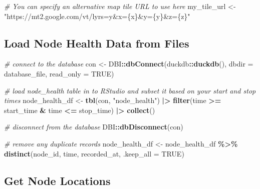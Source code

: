 \documentclass[
]{book}
\newenvironment{Shaded}{\begin{snugshade}}{\end{snugshade}}
\newcommand{\AttributeTok}[1]{\textcolor[rgb]{0.13,0.29,0.53}{#1}}
\newcommand{\CommentTok}[1]{\textcolor[rgb]{0.56,0.35,0.01}{\textit{#1}}}
\newcommand{\ConstantTok}[1]{\textcolor[rgb]{0.56,0.35,0.01}{#1}}
\newcommand{\FunctionTok}[1]{\textcolor[rgb]{0.13,0.29,0.53}{\textbf{#1}}}
\newcommand{\NormalTok}[1]{#1}
\newcommand{\OtherTok}[1]{\textcolor[rgb]{0.56,0.35,0.01}{#1}}
\newcommand{\SpecialCharTok}[1]{\textcolor[rgb]{0.81,0.36,0.00}{\textbf{#1}}}
\newcommand{\StringTok}[1]{\textcolor[rgb]{0.31,0.60,0.02}{#1}}
\begin{document}
\begin{Shaded}
\begin{Highlighting}[]
\CommentTok{\# You can specify an alternative map tile URL to use here}
\NormalTok{my\_tile\_url }\OtherTok{\textless{}{-}} \StringTok{"https://mt2.google.com/vt/lyrs=y\&x=\{x\}\&y=\{y\}\&z=\{z\}"}
\end{Highlighting}
\end{Shaded}

\subsection{Load Node Health Data from Files}\label{load-node-health-data-from-files}

\begin{Shaded}
\begin{Highlighting}[]
\CommentTok{\# connect to the database}
\NormalTok{con }\OtherTok{\textless{}{-}}\NormalTok{ DBI}\SpecialCharTok{::}\FunctionTok{dbConnect}\NormalTok{(duckdb}\SpecialCharTok{::}\FunctionTok{duckdb}\NormalTok{(), }
                      \AttributeTok{dbdir =}\NormalTok{ database\_file, }
                      \AttributeTok{read\_only =} \ConstantTok{TRUE}\NormalTok{)}

\CommentTok{\# load node\_health table in to RStudio and subset it based on your start and stop times}
\NormalTok{node\_health\_df }\OtherTok{\textless{}{-}} \FunctionTok{tbl}\NormalTok{(con, }\StringTok{"node\_health"}\NormalTok{) }\SpecialCharTok{|\textgreater{}} 
  \FunctionTok{filter}\NormalTok{(time }\SpecialCharTok{\textgreater{}=}\NormalTok{ start\_time }\SpecialCharTok{\&}\NormalTok{ time }\SpecialCharTok{\textless{}=}\NormalTok{ stop\_time) }\SpecialCharTok{|\textgreater{}}
  \FunctionTok{collect}\NormalTok{()}

\CommentTok{\# disconnect from the database}
\NormalTok{DBI}\SpecialCharTok{::}\FunctionTok{dbDisconnect}\NormalTok{(con)}

\CommentTok{\# remove any duplicate records}
\NormalTok{node\_health\_df }\OtherTok{\textless{}{-}}\NormalTok{ node\_health\_df }\SpecialCharTok{\%\textgreater{}\%} 
  \FunctionTok{distinct}\NormalTok{(node\_id, }
\NormalTok{           time, }
\NormalTok{           recorded\_at, }
           \AttributeTok{.keep\_all =} \ConstantTok{TRUE}\NormalTok{)}
\end{Highlighting}
\end{Shaded}

\subsection{Get Node Locations}\label{get-node-locations}
\end{document}

